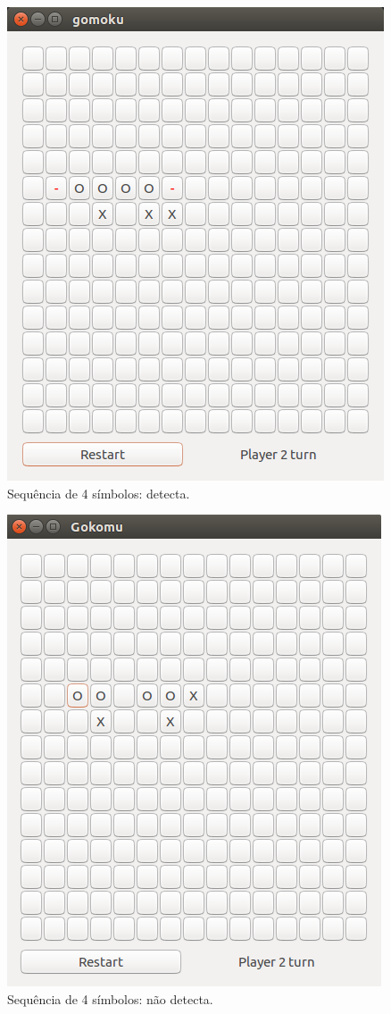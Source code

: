 \documentclass[
	article,			%
	11pt,				%
	oneside,			%
	a4paper,			%
	english,			%
	brazil,				%
	sumario=tradicional
	]{abntex2}
\begin{document}
\begin{figure}[htb]
    \caption{\label{detecta}Sequência de 4 símbolos: detecta.}
        \begin{center}
            \includegraphics[scale=0.71]{detecta.png}
        \end{center}
\end{figure}

\begin{figure}[htb]
    \caption{\label{nao_detecta}Sequência de 4 símbolos: não detecta.}
        \begin{center}
            \includegraphics[scale=0.55]{naodetecta.png}
        \end{center}
\end{figure}
\end{document}
